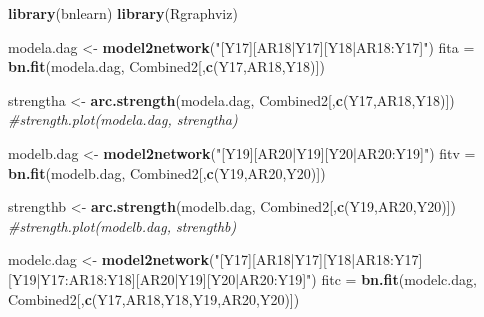 \documentclass[
]{article}
\newenvironment{Shaded}{\begin{snugshade}}{\end{snugshade}}
\newcommand{\CommentTok}[1]{\textcolor[rgb]{0.56,0.35,0.01}{\textit{#1}}}
\newcommand{\FunctionTok}[1]{\textcolor[rgb]{0.13,0.29,0.53}{\textbf{#1}}}
\newcommand{\NormalTok}[1]{#1}
\newcommand{\OtherTok}[1]{\textcolor[rgb]{0.56,0.35,0.01}{#1}}
\newcommand{\StringTok}[1]{\textcolor[rgb]{0.31,0.60,0.02}{#1}}
\begin{document}
\begin{Shaded}
\begin{Highlighting}[]
\FunctionTok{library}\NormalTok{(bnlearn)}
\FunctionTok{library}\NormalTok{(Rgraphviz)}

\NormalTok{modela.dag }\OtherTok{\textless{}{-}} \FunctionTok{model2network}\NormalTok{(}\StringTok{"[Y17][AR18|Y17][Y18|AR18:Y17]"}\NormalTok{)}
\NormalTok{fita }\OtherTok{=} \FunctionTok{bn.fit}\NormalTok{(modela.dag, Combined2[,}\FunctionTok{c}\NormalTok{(}\StringTok{\textquotesingle{}Y17\textquotesingle{}}\NormalTok{,}\StringTok{\textquotesingle{}AR18\textquotesingle{}}\NormalTok{,}\StringTok{\textquotesingle{}Y18\textquotesingle{}}\NormalTok{)])}

\NormalTok{strengtha }\OtherTok{\textless{}{-}} \FunctionTok{arc.strength}\NormalTok{(modela.dag, Combined2[,}\FunctionTok{c}\NormalTok{(}\StringTok{\textquotesingle{}Y17\textquotesingle{}}\NormalTok{,}\StringTok{\textquotesingle{}AR18\textquotesingle{}}\NormalTok{,}\StringTok{\textquotesingle{}Y18\textquotesingle{}}\NormalTok{)])}
\CommentTok{\#strength.plot(modela.dag, strengtha)}

\NormalTok{modelb.dag }\OtherTok{\textless{}{-}} \FunctionTok{model2network}\NormalTok{(}\StringTok{"[Y19][AR20|Y19][Y20|AR20:Y19]"}\NormalTok{)}
\NormalTok{fitv }\OtherTok{=} \FunctionTok{bn.fit}\NormalTok{(modelb.dag, Combined2[,}\FunctionTok{c}\NormalTok{(}\StringTok{\textquotesingle{}Y19\textquotesingle{}}\NormalTok{,}\StringTok{\textquotesingle{}AR20\textquotesingle{}}\NormalTok{,}\StringTok{\textquotesingle{}Y20\textquotesingle{}}\NormalTok{)])}

\NormalTok{strengthb }\OtherTok{\textless{}{-}} \FunctionTok{arc.strength}\NormalTok{(modelb.dag, Combined2[,}\FunctionTok{c}\NormalTok{(}\StringTok{\textquotesingle{}Y19\textquotesingle{}}\NormalTok{,}\StringTok{\textquotesingle{}AR20\textquotesingle{}}\NormalTok{,}\StringTok{\textquotesingle{}Y20\textquotesingle{}}\NormalTok{)])}
\CommentTok{\#strength.plot(modelb.dag, strengthb)}

\NormalTok{modelc.dag }\OtherTok{\textless{}{-}} \FunctionTok{model2network}\NormalTok{(}\StringTok{"[Y17][AR18|Y17][Y18|AR18:Y17][Y19|Y17:AR18:Y18][AR20|Y19][Y20|AR20:Y19]"}\NormalTok{)}
\NormalTok{fitc }\OtherTok{=} \FunctionTok{bn.fit}\NormalTok{(modelc.dag, Combined2[,}\FunctionTok{c}\NormalTok{(}\StringTok{\textquotesingle{}Y17\textquotesingle{}}\NormalTok{,}\StringTok{\textquotesingle{}AR18\textquotesingle{}}\NormalTok{,}\StringTok{\textquotesingle{}Y18\textquotesingle{}}\NormalTok{,}\StringTok{\textquotesingle{}Y19\textquotesingle{}}\NormalTok{,}\StringTok{\textquotesingle{}AR20\textquotesingle{}}\NormalTok{,}\StringTok{\textquotesingle{}Y20\textquotesingle{}}\NormalTok{)])}


\end{Highlighting}
\end{Shaded}
\end{document}
